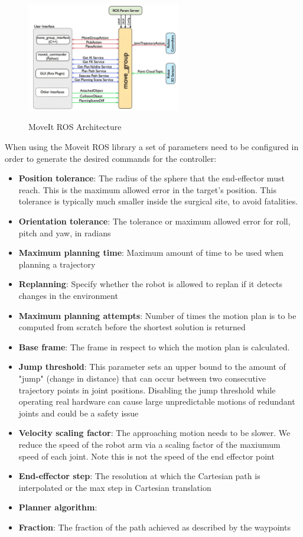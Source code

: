 \begin{center}
\begin{figure}[!htb]
\centering
\includegraphics[width=0.6\textwidth]{images/moveit_move_group.png}\\
\caption{MoveIt ROS Architecture}
\end{figure}
\end{center}

When using the Moveit ROS library a set of parameters need to be configured in order to generate the desired commands for the controller:
\begin{itemize}
	\item \textbf{Position tolerance}: The radius of the sphere that the end-effector must reach. This is the maximum allowed error in the target's position.
	This tolerance is typically much smaller inside the surgical site, to avoid fatalities.
	\item \textbf{Orientation tolerance}: The tolerance or maximum allowed error for roll, pitch and yaw, in radians
	\item \textbf{Maximum planning time}: Maximum amount of time to be used when planning a trajectory
	\item \textbf{Replanning}: Specify whether the robot is allowed to replan if it detects changes in the environment
	\item \textbf{Maximum planning attempts}: Number of times the motion plan is to be computed from scratch before the shortest solution is returned
	\item \textbf{Base frame}: The frame in respect to which the motion plan is calculated.
	\item \textbf{Jump threshold}: This parameter sets an upper bound to the amount of "jump" (change in distance) that can occur between two consecutive trajectory points in joint 
	positions. Disabling the jump threshold while operating real hardware can cause large unpredictable motions of redundant joints 
	and could be a safety issue
	\item \textbf{Velocity scaling factor}: The approaching motion needs to be slower. We reduce the speed of the robot arm via a scaling factor of the 
	maxiumum speed of each joint. Note this is not the speed of the end effector point
	\item \textbf{End-effector step}: The resolution at which the Cartesian path is interpolated or the max step in Cartesian translation
	\item \textbf{Planner algorithm}:
	\item \textbf{Fraction}: The fraction of the path achieved as described by the waypoints
\end{itemize}

